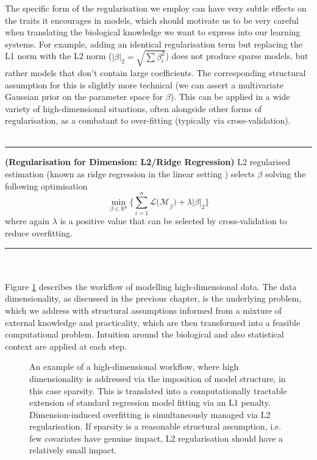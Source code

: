 \documentclass[thesis.tex]{subfiles}
\begin{document}
The specific form of the regularisation we employ can have very subtle effects on the traits it encourages in models, which should motivate us to be very careful when translating the biological knowledge we want to express into our learning systems. For example, adding an identical regularisation term but replacing the L1 norm with the L2 norm ($|\beta|_2 = \sqrt{\sum \beta_i^2}$) does not produce sparse models, but rather models that don't contain large coefficients. The corresponding structural assumption for this is slightly more technical (we can assert a multivariate Gaussian prior on the parameter space for $\beta$). This can be applied in a wide variety of high-dimensional situations, often alongside other forms of regularisation, as a combatant to over-fitting (typically via cross-validation). \\ ~ \\


\hrule
\begin{technique}{\textbf{(Regularisation for Dimension: L2/Ridge Regression)}}
L2 regularised estimation (known as ridge regression in the linear setting \citep{hoerl_ridge_2000}) selects $\beta$ solving the following optimisation
$$\min_{\beta \in \mathbb{R}^p} \{\sum\limits_{i = 1}^{n} \mathcal{L(M}_\beta) + \lambda |\beta|_2 \} $$
where again $\lambda$ is a positive value that can be selected by cross-validation to reduce overfitting.
\end{technique}
\hrule ~ \\ ~ \\

Figure \ref{fig:workflow} describes the workflow of modelling high-dimensional data. The data dimensionality, as discussed in the previous chapter, is the underlying problem, which we address with structural assumptions informed from a mixture of external knowledge and practicality, which are then transformed into a feasible computational problem. Intuition around the biological and also statistical context are applied at each step.

\begin{figure}[htbp]
\centering
{}
\caption{An example of a high-dimensional workflow, where high dimensionality is addressed via the imposition of model structure, in this case sparsity. This is translated into a computationally tractable extension of standard regression model fitting via an L1 penalty. Dimension-induced overfitting is simultaneously managed via L2 regularisation. If sparsity is a reasonable structural assumption, i.e. few covariates have genuine impact, L2 regularisation should have a relatively small impact.\label{fig:workflow}}
\end{figure}
\end{document}
